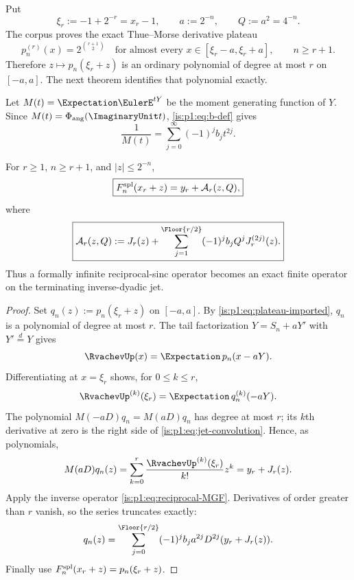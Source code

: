 Put
\begin{equation}
 \xi_r:=-1+2^{-r}=x_r-1,
 \qquad a:=2^{-n},\qquad Q:=a^2=4^{-n}.
 \label{is:p1:eq:xi-a-Q}
\end{equation}
The corpus proves the exact Thue--Morse derivative plateau
\begin{equation}
 p_n^{(r)}(x)=2^{\binom{r+1}{2}}
 \quad\text{for almost every }x\in[\xi_r-a,\xi_r+a],
 \qquad n\ge r+1.
 \label{is:p1:eq:plateau-imported}
\end{equation}
Therefore $z\mapsto p_n(\xi_r+z)$ is an ordinary polynomial of degree at most
$r$ on $[-a,a]$.  The next theorem identifies that polynomial exactly.

Let $M(t)=\Expectation\EulerE^{tY}$ be the moment generating function of $Y$.  Since
$M(t)=\PhiAng(\ImaginaryUnit t)$, \eqref{is:p1:eq:b-def} gives
\begin{equation}
 \frac1{M(t)}=\sum_{j=0}^{\infty}(-1)^jb_jt^{2j}.
 \label{is:p1:eq:reciprocal-MGF}
\end{equation}

\begin{theorem}
\label{is:p1:thm:exact-local-polynomial}
For $r\ge1$, $n\ge r+1$, and $|z|\le2^{-n}$,
\begin{equation}
 \boxed{
 F_{n}^{\mathrm{spl}}(x_r+z)=y_r+\mathcal A_r(z,Q),}
 \label{is:p1:eq:exact-local-Pn}
\end{equation}
where
\begin{equation}
 \boxed{
 \mathcal A_r(z,Q):=
 J_r(z)+\sum_{j=1}^{\Floor{r/2}}
 (-1)^jb_jQ^jJ_r^{(2j)}(z).}
 \label{is:p1:eq:Ar-def}
\end{equation}
Thus a formally infinite reciprocal-sinc operator becomes an exact finite operator on the
terminating inverse-dyadic jet.
\end{theorem}

\begin{proof}
Set $q_n(z):=p_n(\xi_r+z)$ on $[-a,a]$.  By
\eqref{is:p1:eq:plateau-imported}, $q_n$ is a polynomial of degree at most $r$.
The tail factorization $Y=S_n+aY'$ with $Y'\stackrel d=Y$ gives
\begin{equation}
 \RvachevUp(x)=\Expectation\,p_n(x-aY).
 \label{is:p1:eq:convolution-expectation}
\end{equation}
Differentiating at $x=\xi_r$ shows, for $0\le k\le r$,
\begin{equation}
 \RvachevUp^{(k)}(\xi_r)=\Expectation\,q_n^{(k)}(-aY).
 \label{is:p1:eq:jet-convolution}
\end{equation}
The polynomial $M(-aD)q_n=M(aD)q_n$ has degree at most $r$; its $k$th
derivative at zero is the right side of \eqref{is:p1:eq:jet-convolution}.  Hence, as
polynomials,
\begin{equation}
 M(aD)q_n(z)=
 \sum_{k=0}^{r}\frac{\RvachevUp^{(k)}(\xi_r)}{k!}z^k
 =y_r+J_r(z).
 \label{is:p1:eq:polynomial-smoothing}
\end{equation}
Apply the inverse operator \eqref{is:p1:eq:reciprocal-MGF}.  Derivatives of order greater
than $r$ vanish, so the series truncates exactly:
\[
 q_n(z)=\sum_{j=0}^{\Floor{r/2}}
 (-1)^jb_ja^{2j}D^{2j}(y_r+J_r(z)).
\]
Finally use $F_{n}^{\mathrm{spl}}(x_r+z)=p_n(\xi_r+z)$.
\end{proof}

